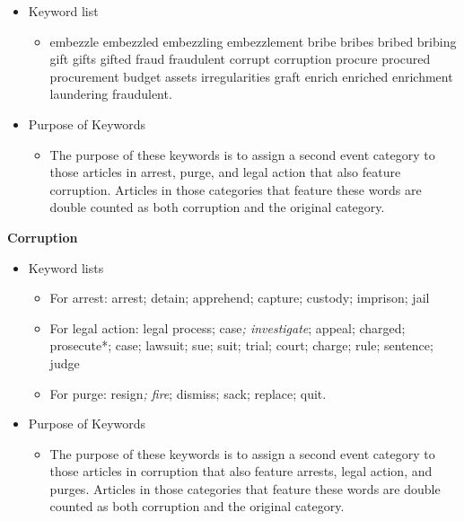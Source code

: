 \documentclass[
  letterpaper,
  DIV=11,
  numbers=noendperiod]{scrartcl}
\providecommand{\tightlist}{%
  \setlength{\itemsep}{0pt}\setlength{\parskip}{0pt}}\usepackage{longtable,booktabs,array}
\begin{document}
\begin{itemize}
\tightlist
\item
  Keyword list

  \begin{itemize}
  \tightlist
  \item
    embezzle \textbar{} embezzled \textbar{} embezzling \textbar{}
    embezzlement \textbar{} bribe \textbar{} bribes \textbar{} bribed
    \textbar{} bribing \textbar{} gift \textbar{} gifts \textbar{}
    gifted \textbar{} fraud \textbar{} fraudulent \textbar{} corrupt
    \textbar{} corruption \textbar{} procure \textbar{} procured
    \textbar{} procurement \textbar{} budget \textbar{} assets
    \textbar{} irregularities \textbar{} graft \textbar{} enrich
    \textbar{} enriched \textbar{} enrichment \textbar{} laundering
    \textbar{} fraudulent.
  \end{itemize}
\item
  Purpose of Keywords

  \begin{itemize}
  \tightlist
  \item
    The purpose of these keywords is to assign a second event category
    to those articles in arrest, purge, and legal action that also
    feature corruption. Articles in those categories that feature these
    words are double counted as both corruption and the original
    category.
  \end{itemize}
\end{itemize}

\textbf{Corruption}

\begin{itemize}
\tightlist
\item
  Keyword lists

  \begin{itemize}
  \tightlist
  \item
    For arrest: arrest; detain; apprehend; capture; custody; imprison;
    jail
  \item
    For legal action: legal process; case\emph{; investigate}; appeal;
    charged; prosecute*; case; lawsuit; sue; suit; trial; court; charge;
    rule; sentence; judge
  \item
    For purge: resign\emph{; fire}; dismiss; sack; replace; quit.
  \end{itemize}
\item
  Purpose of Keywords

  \begin{itemize}
  \tightlist
  \item
    The purpose of these keywords is to assign a second event category
    to those articles in corruption that also feature arrests, legal
    action, and purges. Articles in those categories that feature these
    words are double counted as both corruption and the original
    category.
  \end{itemize}
\end{itemize}
\end{document}

